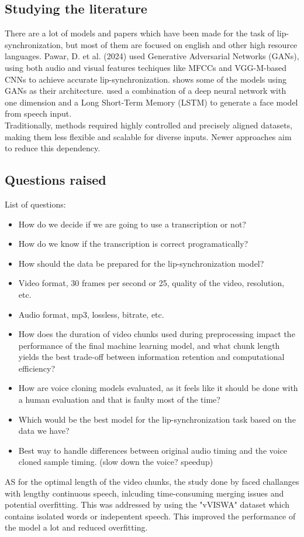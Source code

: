 \documentclass[12pt]{article}
\begin{document}
\subsection{Studying the literature}
There are a lot of models and papers which have been made for the task of lip-synchronization, but most of them are focused on english and other high resource languages. Pawar, D. et al. (2024) used Generative Adversarial Networks (GANs), using both audio and visual features techiques like MFCCs and VGG-M-based CNNs to achieve accurate lip-synchronization. \cite{PAWAR2024100084} shows some of the models using GANs as their architecture. \cite{Li_2021} used a combination of a deep neural network with one dimension and a Long Short-Term Memory (LSTM) to generate a face model from speech input.\\
Traditionally, methods required highly controlled and precisely aligned datasets, making them less flexible and scalable for diverse inputs. Newer approaches aim to reduce this dependency. 
\subsection{Questions raised}
List of questions:
\begin{itemize}
    \item How do we decide if we are going to use a transcription or not?
    \item How do we know if the transcription is correct programatically?
    \item How should the data be prepared for the lip-synchronization model?
    \item Video format, 30 frames per second or 25, quality of the video, resolution, etc.
    \item Audio format, mp3, lossless, bitrate, etc.
    \item How does the duration of video chunks used during preprocessing impact the performance of the final machine learning model, and what chunk length yields the best trade-off between information retention and computational efficiency?
    \item How are voice cloning models evaluated, as it feels like it should be done with a human evaluation and that is faulty most of the time?
    \item Which would be the best model for the lip-synchronization task based on the data we have?
    \item Best way to handle differences between original audio timing and the voice cloned sample timing. (slow down the voice? speedup)
\end{itemize}
AS for the optimal length of the video chunks, the study done by \cite{PAWAR2024100084} faced challanges with lengthy continuous speech, inlcuding time-consuming merging issues and potential overfitting. This was addressed by using the "vVISWA" dataset which contains isolated words or indepentent speech. This improved the performance of the model a lot and reduced overfitting.
\end{document}

